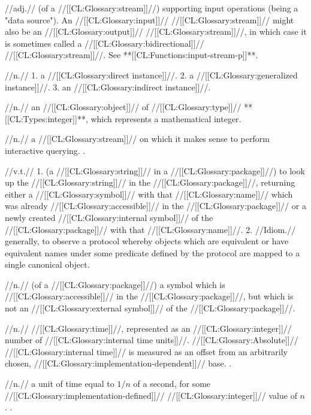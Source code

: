  //adj.// (of a //[[CL:Glossary:stream]]//) supporting input operations (\ie being a "data source"). An //[[CL:Glossary:input]]// //[[CL:Glossary:stream]]// might also be an //[[CL:Glossary:output]]// //[[CL:Glossary:stream]]//, in which case it is sometimes called a //[[CL:Glossary:bidirectional]]// //[[CL:Glossary:stream]]//. See **[[CL:Functions:input-stream-p]]**.

 //n.// 1. a //[[CL:Glossary:direct instance]]//. 2. a //[[CL:Glossary:generalized instance]]//. 3. an //[[CL:Glossary:indirect instance]]//.

 //n.// an //[[CL:Glossary:object]]// of //[[CL:Glossary:type]]// **[[CL:Types:integer]]**, which represents a mathematical integer.

 //n.// a //[[CL:Glossary:stream]]// on which it makes sense to perform interactive querying. \Seesection\InteractiveStreams.

 //v.t.// 1. (a //[[CL:Glossary:string]]// in a //[[CL:Glossary:package]]//) to look up the //[[CL:Glossary:string]]// in the //[[CL:Glossary:package]]//, returning either a //[[CL:Glossary:symbol]]// with that //[[CL:Glossary:name]]// which was already //[[CL:Glossary:accessible]]// in the //[[CL:Glossary:package]]// or a newly created //[[CL:Glossary:internal symbol]]// of the //[[CL:Glossary:package]]// with that //[[CL:Glossary:name]]//. 2. //Idiom.// generally, to observe a protocol whereby objects which are equivalent or have equivalent names under some predicate defined by the protocol are mapped to a single canonical object.

 //n.// (of a //[[CL:Glossary:package]]//) a symbol which is //[[CL:Glossary:accessible]]// in the //[[CL:Glossary:package]]//, but which is not an //[[CL:Glossary:external symbol]]// of the //[[CL:Glossary:package]]//.

 //n.// //[[CL:Glossary:time]]//, represented as an //[[CL:Glossary:integer]]// number of //[[CL:Glossary:internal time units]]//. //[[CL:Glossary:Absolute]]// //[[CL:Glossary:internal time]]// is measured as an offset from an arbitrarily chosen, //[[CL:Glossary:implementation-dependent]]// base. \Seesection\InternalTime.

 //n.// a unit of time equal to $1/n$ of a second, for some //[[CL:Glossary:implementation-defined]]// //[[CL:Glossary:integer]]// value of $n$. .

